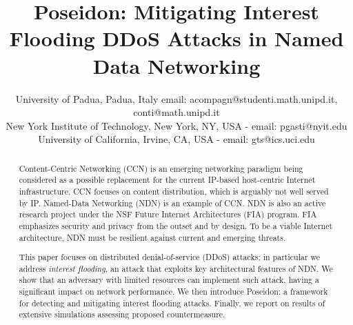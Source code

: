 \documentclass[10pt,conference,letterpaper]{IEEEtran}
\begin{document}
\IEEEoverridecommandlockouts 

\title{Poseidon: Mitigating Interest Flooding DDoS Attacks in Named Data Networking}


\author{
University of Padua, Padua, Italy email: acompagn@studenti.math.unipd.it, conti@math.unipd.it
\\
New York Institute of Technology,  New York, NY, USA - email: pgasti@nyit.edu
\\
University of California, Irvine, CA, USA - email: gts@ics.uci.edu
}

\maketitle






\begin{abstract}
Content-Centric Networking (CCN) is an emerging networking paradigm being considered as a possible replacement for the current IP-based host-centric Internet infrastructure. 
CCN focuses on content distribution, which 
is arguably not well served by IP.
Named-Data Networking (NDN) is an example of CCN. NDN is also an active research project under the NSF Future Internet Architectures (FIA) program. FIA emphasizes security and privacy from the outset and by design. To be a viable Internet architecture, NDN must be resilient against current and emerging threats.

This paper focuses on distributed denial-of-service (DDoS) attacks; in particular we address {\em interest flooding}, an attack that exploits key architectural features of NDN. We show that an adversary with limited resources can implement such attack, having a significant impact on network performance. We then introduce Poseidon: a framework for detecting and mitigating interest flooding attacks. Finally, we report on results of extensive simulations assessing proposed countermeasure.
\end{abstract}
\end{document}
